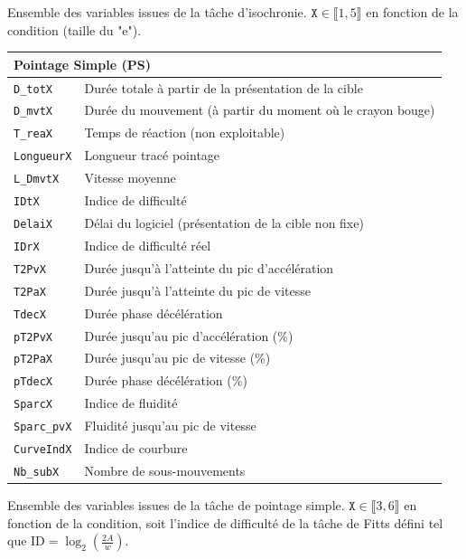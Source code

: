 Ensemble des variables issues de la tâche d'isochronie. $\texttt{X} \in \llbracket 1,5 \rrbracket$ en fonction de la condition (taille du "e").

\medskip

\begin{table}[h]
	\centering
	\begin{tabular}{p{}|p{}}
		\multicolumn{2}{l}{\textbf{Pointage Simple (PS)}} \\ \hline
		\texttt{D\_totX} & Durée totale à partir de la présentation de la cible \\
		\texttt{D\_mvtX} & Durée du mouvement (à partir du moment où le crayon bouge) \\
		\texttt{T\_reaX} & Temps de réaction (non exploitable) \\
		\texttt{LongueurX} & Longueur tracé pointage \\
		\texttt{L\_DmvtX} & Vitesse moyenne \\
		\texttt{IDtX} & Indice de difficulté \\
		\texttt{DelaiX} & Délai du logiciel (présentation de la cible non fixe) \\
		\texttt{IDrX} & Indice de difficulté réel \\
		\texttt{T2PvX} & Durée jusqu'à l'atteinte du pic d'accélération \\
		\texttt{T2PaX} & Durée jusqu'à l'atteinte du pic de vitesse \\
		\texttt{TdecX} & Durée phase décélération \\
		\texttt{pT2PvX} & Durée jusqu'au pic d'accélération (\%) \\
		\texttt{pT2PaX} & Durée jusqu'au pic de vitesse (\%) \\
		\texttt{pTdecX} & Durée phase décélération (\%) \\
		\texttt{SparcX} & Indice de fluidité \\
		\texttt{Sparc\_pvX} & Fluidité jusqu'au pic de vitesse \\
		\texttt{CurveIndX} & Indice de courbure \\
		\texttt{Nb\_subX} & Nombre de sous-mouvements \\
	\end{tabular}
\end{table}

Ensemble des variables issues de la tâche de pointage simple. $\texttt{X} \in \llbracket 3,6 \rrbracket$ en fonction de la condition, soit l'indice de difficulté de la tâche de Fitts défini tel que $\text{ID} = \log_2\!\left(\frac{2A}{w}\right)$.

